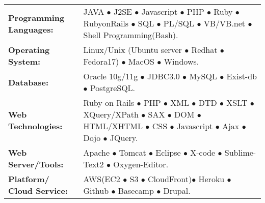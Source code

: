 \documentclass[11pt]{article} %
\begin{document}
{%
\begin{table}[!ht]
    \begin{adjustwidth}{-0.5em}{-0.5em}\begin{tabular}{p{}p{}}
        \textbf{ Programming Languages:} & 
{JAVA $\bullet$ J2SE $\bullet$ Javascript $\bullet$ PHP $\bullet$ Ruby $\bullet$ RubyonRails $\bullet$ SQL $\bullet$ PL/SQL $\bullet$ VB/VB.net $\bullet$ Shell Programming(Bash).}\\ 
        \textbf{ Operating System:}           
& {Linux/Unix (Ubuntu server $\bullet$ Redhat $\bullet$ Fedora17) $\bullet$ MacOS $\bullet$ Windows.}\\ 
        \textbf{ Database:}&
{Oracle 10g/11g $\bullet$ JDBC3.0 $\bullet$ MySQL $\bullet$ Exist-db $\bullet$ PostgreSQL.}\\
        \textbf{ Web Technologies:}&
{Ruby on Rails $\bullet$ PHP $\bullet$ XML $\bullet$ DTD $\bullet$ XSLT $\bullet$ XQuery/XPath $\bullet$ SAX $\bullet$ DOM $\bullet$ HTML/XHTML $\bullet$ CSS $\bullet$ Javascript $\bullet$ Ajax $\bullet$ Dojo $\bullet$ JQuery.}\\ 
        \textbf{ Web Server/Tools:}&
{Apache $\bullet$ Tomcat $\bullet$ Eclipse $\bullet$ X-code $\bullet$ Sublime-Text2 $\bullet$ Oxygen-Editor.}\\ 
        \textbf{ Platform/ Cloud Service:}&
{AWS(EC2 $\bullet$ S3 $\bullet$ CloudFront)}{$\bullet$ Heroku $\bullet$ Github $\bullet$ Basecamp $\bullet$ Drupal.}
    \end{tabular}\end{adjustwidth}
\end{table}
}
\end{document}
